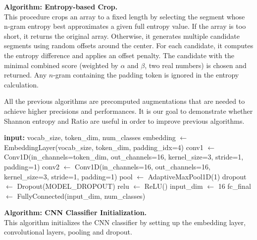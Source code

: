 \documentclass{article}
\theoremstyle{remark}
\begin{document}
\noindent
\textbf{Algorithm: Entropy-based Crop.}\\
This procedure crops an array to a fixed length by selecting the segment whose n‑gram entropy best approximates a given full entropy value. If the array is too short, it returns the original array. Otherwise, it generates multiple candidate segments using random offsets around the center. For each candidate, it computes the entropy difference and applies an offset penalty. The candidate with the minimal combined score (weighted by $\alpha$ and $\beta$, two real numbers) is chosen and returned. Any \(n\)-gram containing the padding token is ignored in the entropy calculation.

\vspace{1em}





All the previous algorithms are precomputed augmentations that are needed to achieve higher precisions and performances. It is our goal to demonstrate whether Shannon entropy and Ratio are useful in order to improve previous algorithms.
\noindent







\begin{algorithm}[H]
\caption{Algorithm: CNN Classifier Initialization}
\begin{algorithmic}[1]
    \State \textbf{input:} vocab\_size, token\_dim, num\_classes
    \State embedding $\gets$ EmbeddingLayer(vocab\_size, token\_dim, padding\_idx=4)
    \State conv1 $\gets$ Conv1D(in\_channels=token\_dim, out\_channels=16, kernel\_size=3, stride=1, padding=1)
    \State conv2 $\gets$ Conv1D(in\_channels=16, out\_channels=16, kernel\_size=3, stride=1, padding=1)
    \State pool $\gets$ AdaptiveMaxPool1D(1)
    \State dropout $\gets$ Dropout(MODEL\_DROPOUT)
    \State relu $\gets$ ReLU()
    \State input\_dim $\gets$ 16
    \State fc\_final $\gets$ FullyConnected(input\_dim, num\_classes)
\EndProcedure
\end{algorithmic}
\end{algorithm}



\noindent
\textbf{Algorithm: CNN Classifier Initialization.}\\
This algorithm initializes the CNN classifier by setting up the embedding layer, convolutional layers, pooling and dropout.
\end{document}
